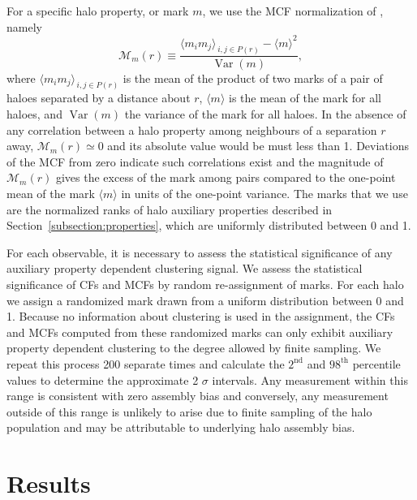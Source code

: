 \documentclass[usenatbib,fleqn]{mnras}
\begin{document}
For a specific halo property, or mark $m$, we use the MCF normalization of \citet{wechsler_etal06}, namely 
%
\begin{equation}
\label{eq:mcf}
\mathcal{M}_m(r) \equiv \frac{\langle m_i m_j \rangle_{\,i,j \in P(r)} - 
\langle m \rangle^2}{\operatorname{Var}(m)},
\end{equation}
%
where $\langle m_i m_j \rangle_{\,i,j \in P(r)}$ is the mean of the product of two marks of a pair of haloes separated by a distance about $r$, $\langle m \rangle$ is the mean of the mark for all haloes, and $\operatorname{Var}(m)$ the variance of the mark for all haloes.
In the absence of any correlation between a halo property among neighbours of a separation $r$ away, $\mathcal{M}_m(r) \simeq 0$ and its absolute value would be must less than 1. Deviations of the MCF from zero indicate such correlations exist and the magnitude of $\mathcal{M}_m(r)$ gives the excess of the mark among pairs compared to the one-point mean of the mark $\langle m\rangle$ in units of the one-point variance. The marks that we use are the normalized ranks of halo auxiliary properties described in Section~\ref{subsection:properties}, which are uniformly distributed between 0 and 1. 

For each observable, it is necessary to assess the statistical significance of any auxiliary property dependent clustering signal. We assess the statistical significance of CFs and MCFs by random re-assignment of marks. For each halo we assign a randomized mark drawn from a uniform distribution between 0 and 1. Because no information about clustering is used in the assignment, the CFs and MCFs computed from these randomized marks can only exhibit auxiliary property dependent clustering to the degree allowed by finite sampling. We repeat this process 200 separate times and calculate the $2^{\mathrm{nd}}$ and $98^{\mathrm{th}}$ percentile values to determine the approximate 2 $\sigma$ intervals. Any measurement within this range is consistent with zero assembly bias and conversely, any measurement outside of this range is unlikely to arise due to finite sampling of the halo population and may be attributable to underlying halo assembly bias.


\section[]{Results}
\label{section:results}


\end{document}
